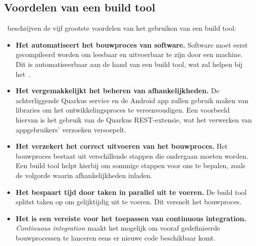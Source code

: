 \subsection{Voordelen van een build tool}
\label{subsec:voordelen-van-een-build-tool}
\textcite{Kandhway2019}~beschrijven de vijf grootste voordelen van het gebruiken van een build tool:
\begin{itemize}
    \item \textbf{Het automatiseert het bouwproces van software.}
    Software moet eerst gecompileerd worden om leesbaar en uitvoerbaar te zijn door een machine.
    Dit is automatiseerbaar aan de hand van een build tool, wat zal helpen bij het~.
    \item \textbf{Het vergemakkelijkt het beheren van afhankelijkheden.}
    De achterliggende Quarkus service en de Android app zullen gebruik maken van libraries om het ontwikkelingsproces te vereenvoudigen.
    Een voorbeeld hiervan is het gebruik van de Quarkus REST-extensie, wat het verwerken van appgebruikers' verzoeken versoepelt.
    \item \textbf{Het verzekert het correct uitvoeren van het bouwproces.}
    Het bouwproces bestaat uit verschillende stappen die ondergaan moeten worden.
    Een build tool helpt hierbij om sommige stappen voor ons te bepalen, zoals de volgorde waarin afhankelijkheden inladen.
    \item \textbf{Het bespaart tijd door taken in parallel uit te voeren.}
    De build tool splitst taken op om gelijktijdig uit te voeren.
    Dit versnelt het bouwproces.
    \item \textbf{Het is een vereiste voor het toepassen van continuous integration.}
    \textit{Continuous integration} maakt het mogelijk om vooraf gedefinieerde bouwprocessen te lanceren eens er nieuwe code beschikbaar komt.
\end{itemize}

